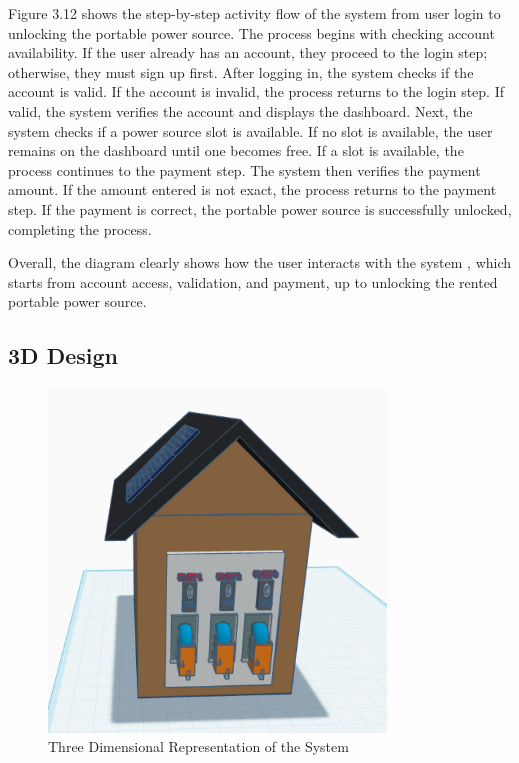 {Figure 3.12 shows the step-by-step activity flow of the system from user login to unlocking the portable power source. The process begins with checking account availability. If the user already has an account, they proceed to the login step; otherwise, they must sign up first. After logging in, the system checks if the account is valid. If the account is invalid, the process returns to the login step. If valid, the system verifies the account and displays the dashboard. Next, the system checks if a power source slot is available. If no slot is available, the user remains on the dashboard until one becomes free. If a slot is available, the process continues to the payment step. The system then verifies the payment amount. If the amount entered is not exact, the process returns to the payment step. If the payment is correct, the portable power source is successfully unlocked, completing the process.
 
 Overall, the diagram clearly shows how the user interacts with the system , which starts from account access, validation, and payment, up to unlocking the rented portable power source.

   
  \subsection{3D Design}
  
    \begin{figure}[H]
  	\centering
  	\caption{Three Dimensional Representation of the System}
  	\label{fig:3d}
  	\includegraphics[width=0.8\textwidth]{figures/3D.png}
  \end{figure}
  
}
